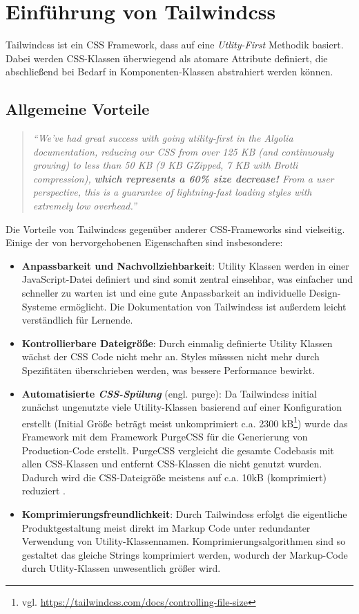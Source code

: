 \chapter{Einführung von Tailwindcss}
\label{cha:Tailwindcss}
Tailwindcss ist ein CSS Framework, dass auf eine \textit{Utlity-First} Methodik basiert. Dabei werden CSS-Klassen überwiegend als atomare Attribute definiert, die abschließend bei Bedarf in Komponenten-Klassen abstrahiert werden können.

\section{Allgemeine Vorteile}
\begin{quotation}
	\emph{``We’ve had great success with going utility-first in the Algolia documentation, reducing our CSS from over 125 KB (and continuously growing) to less than 50 KB (9 KB GZipped, 7 KB with Brotli compression), \textbf{which represents a 60\% size decrease!} From a user perspective, this is a guarantee of lightning-fast loading styles with extremely low overhead.''}
	\citep{AlgoliaTailwindBlog}
\end{quotation}
Die Vorteile von Tailwindcss gegenüber anderer CSS-Frameworks sind vielseitig. Einige der von \cite{AlgoliaTailwindBlog} hervorgehobenen Eigenschaften sind insbesondere:
\begin{itemize}
  \item \textbf{Anpassbarkeit und Nachvollziehbarkeit}: Utility Klassen werden in einer JavaScript-Datei definiert und sind somit zentral einsehbar, was einfacher und schneller zu warten ist und eine gute Anpassbarkeit an individuelle Design-Systeme ermöglicht. Die Dokumentation von Tailwindcss ist außerdem leicht verständlich für Lernende.
  \item \textbf{Kontrollierbare Dateigröße}: Durch einmalig definierte Utility Klassen wächst der CSS Code nicht mehr an. Styles müsssen nicht mehr durch Spezifitäten überschrieben werden, was bessere Performance bewirkt.
  \item \textbf{Automatisierte \textit{CSS-Spülung}} (engl. purge): Da Tailwindcss initial zunächst ungenutzte viele Utility-Klassen basierend auf einer Konfiguration erstellt (Initial Größe beträgt meist unkomprimiert c.a. 2300 kB\footnote{vgl. \url{https://tailwindcss.com/docs/controlling-file-size}}) wurde das Framework mit dem Framework PurgeCSS für die Generierung von Production-Code erstellt. PurgeCSS vergleicht die gesamte Codebasis mit allen CSS-Klassen und entfernt CSS-Klassen die nicht genutzt wurden. Dadurch wird die CSS-Dateigröße meistens auf c.a. 10kB (komprimiert) reduziert \citep{TailwindcssDocsFileControll}.
  \item \textbf{Komprimierungsfreundlichkeit}: Durch Tailwindcss erfolgt die eigentliche Produktgestaltung meist direkt im Markup Code unter redundanter Verwendung von Utility-Klassennamen. Komprimierungsalgorithmen sind so gestaltet das gleiche Strings komprimiert werden, wodurch der Markup-Code durch Utlity-Klassen unwesentlich größer wird.
\end{itemize}

